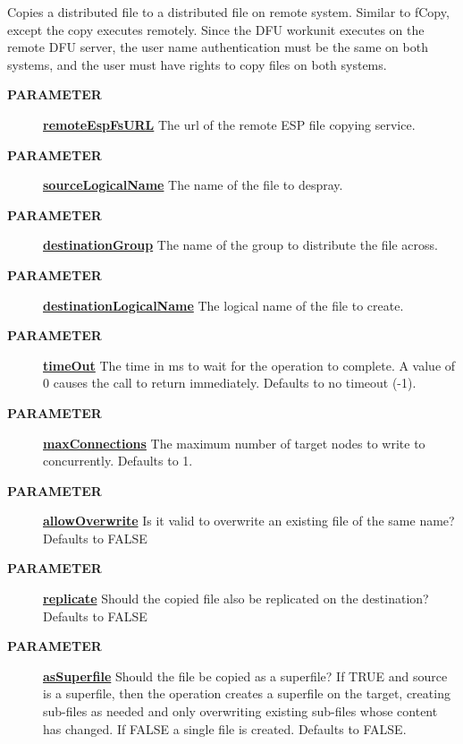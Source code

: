 \par
Copies a distributed file to a distributed file on remote system. Similar to fCopy, except the copy executes remotely. Since the DFU workunit executes on the remote DFU server, the user name authentication must be the same on both systems, and the user must have rights to copy files on both systems.

\par
\begin{description}
\item [\colorbox{tagtype}{\color{white} \textbf{\textsf{PARAMETER}}}] \textbf{\underline{remoteEspFsURL}} The url of the remote ESP file copying service.
\item [\colorbox{tagtype}{\color{white} \textbf{\textsf{PARAMETER}}}] \textbf{\underline{sourceLogicalName}} The name of the file to despray.
\item [\colorbox{tagtype}{\color{white} \textbf{\textsf{PARAMETER}}}] \textbf{\underline{destinationGroup}} The name of the group to distribute the file across.
\item [\colorbox{tagtype}{\color{white} \textbf{\textsf{PARAMETER}}}] \textbf{\underline{destinationLogicalName}} The logical name of the file to create.
\item [\colorbox{tagtype}{\color{white} \textbf{\textsf{PARAMETER}}}] \textbf{\underline{timeOut}} The time in ms to wait for the operation to complete. A value of 0 causes the call to return immediately. Defaults to no timeout (-1).
\item [\colorbox{tagtype}{\color{white} \textbf{\textsf{PARAMETER}}}] \textbf{\underline{maxConnections}} The maximum number of target nodes to write to concurrently. Defaults to 1.
\item [\colorbox{tagtype}{\color{white} \textbf{\textsf{PARAMETER}}}] \textbf{\underline{allowOverwrite}} Is it valid to overwrite an existing file of the same name? Defaults to FALSE
\item [\colorbox{tagtype}{\color{white} \textbf{\textsf{PARAMETER}}}] \textbf{\underline{replicate}} Should the copied file also be replicated on the destination? Defaults to FALSE
\item [\colorbox{tagtype}{\color{white} \textbf{\textsf{PARAMETER}}}] \textbf{\underline{asSuperfile}} Should the file be copied as a superfile? If TRUE and source is a superfile, then the operation creates a superfile on the target, creating sub-files as needed and only overwriting existing sub-files whose content has changed. If FALSE a single file is created. Defaults to FALSE.

\end{description}
